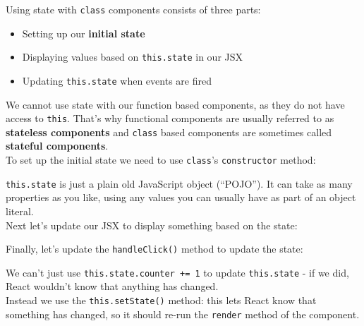 Using state with \texttt{class} components consists of three parts:

\begin{itemize}
    \item Setting up our \textbf{initial state}
    \item Displaying values based on \texttt{this.state} in our JSX
    \item Updating \texttt{this.state} when events are fired
\end{itemize}

We cannot use state with our function based components, as they do not have access to \texttt{this}. That's why functional components are usually referred to as \textbf{stateless components} and \texttt{class} based components are sometimes called \textbf{stateful components}.
\\

To set up the initial state we need to use \texttt{class}'s \texttt{constructor} method:


\texttt{this.state} is just a plain old JavaScript object (``POJO''). It can take as many properties as you like, using any values you can usually have as part of an object literal.
\\

Next let's update our JSX to display something based on the state:


Finally, let's update the \texttt{handleClick()} method to update the state:


We can't just use \texttt{this.state.counter += 1} to update \texttt{this.state} - if we did, React wouldn't know that anything has changed.
\\

Instead we use the \texttt{this.setState()} method: this lets React know that something has changed, so it should re-run the \texttt{render} method of the component.

